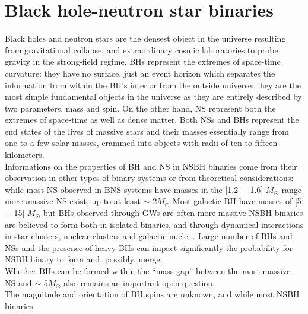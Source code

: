 \documentclass[binding=0.6cm, LaM]{sapthesis}
\begin{document}

\chapter{Black hole-neutron star binaries}

        Black holes and neutron stars are the densest object in the universe resulting from gravitational collapse,
        and extraordinary cosmic laboratories to probe gravity in the strong-field regime.
        BHs represent the extremes of space-time curvature:
        they have no surface, just an event horizon which separates the information
        from within the BH’s interior from the outside universe;
        they are the most simple fundamental objects in the universe
        as they are entirely described by two parameters, mass and spin.
        On the other hand, NS represent both the extremes of space-time as well as dense matter.
        Both NSs and BHs represent the end states of the lives of massive stars
        and their masses essentially range from one to a few solar masses,
        crammed into objects with radii of ten to fifteen kilometers. \\
        Informations on the properties of BH and NS in NSBH binaries come from
        their observation in other types of binary systems or from theoretical considerations:
        while most NS observed in BNS systems have masses in the [1.2 − 1.6] $M_{\odot}$ range %
        more massive NS exist, up to at least $\sim$ 2$M_{\odot}$  %
        Most galactic BH have masses of [5 − 15] $M_{\odot}$  %
        but BHs observed through GWs are often more massive %
        NSBH binaries are believed to form both in isolated binaries,
        and through dynamical interactions in star clusters, nuclear clusters and galactic nuclei \cite{194}.
        Large number of BHs and NSs and the presence of heavy BHs can impact significantly
        the probability for NSBH binary to form and, possibly, merge. \\
        Whether BHs can be formed within the “mass gap” between the most massive NS
        and $\sim$ 5$M_{\odot}$ also remains an important open question. \\
        The magnitude and orientation of BH spins are unknown, and while most NSBH binaries
\end{document}
